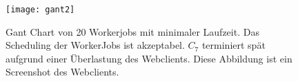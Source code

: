 \begin{figure}[H]
  \begin{center}
    \texttt{[image: gant2]}
    \caption{Gant Chart von 20 Workerjobs mit minimaler Laufzeit.
    \label{fig:gant2}
    Das Scheduling der WorkerJobs ist akzeptabel. $C_7$ terminiert spät aufgrund einer Überlastung des Webclients. Diese Abbildung ist ein Screenshot des Webclients.}
  \end{center}
\end{figure}
\noindent
